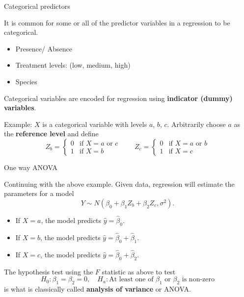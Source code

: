 \documentclass[
  ignorenonframetext,
]{beamer}
\providecommand{\tightlist}{%
  \setlength{\itemsep}{0pt}\setlength{\parskip}{0pt}}
\begin{document}
\begin{frame}{Categorical predictors}
\protect\hypertarget{categorical-predictors}{}

It is common for some or all of the predictor variables in a regression
to be categorical.

\begin{itemize}
\tightlist
\item
  Presence/ Absence
\item
  Treatment levels: (low, medium, high)
\item
  Species
\end{itemize}

Categorical variables are encoded for regression using \textbf{indicator
(dummy) variables}.

Example: \(X\) is a categorical variable with levels \(a\), \(b\),
\(c\). Arbitrarily choose \(a\) as the \textbf{reference level} and
define \[
Z_b=\begin{cases} 
0 & \mbox{if } X =a\text{ or }c \\
1 & \mbox{if } X=b 
\end{cases}
\qquad
Z_c=\begin{cases} 
0 & \mbox{if } X = a \text{ or } b\\
1 & \mbox{if } X=c 
\end{cases}
\]

\end{frame}

\begin{frame}{One way ANOVA}
\protect\hypertarget{one-way-anova}{}

Continuing with the above example. Given data, regression will estimate
the parameters for a model \[
Y \sim N(\beta_0+\beta_1Z_b+\beta_2Z_c, \sigma^2).
\]

\begin{itemize}
\tightlist
\item
  If \(X=a\), the model predicts \(\hat y= \hat\beta_0\).
\item
  If \(X=b\), the model predicts \(\hat y= \hat\beta_0 + \hat\beta_1\).
\item
  If \(X=c\), the model predicts \(\hat y= \hat\beta_0 + \hat\beta_2\).
\end{itemize}

The hypothesis test using the \(F\) statistic as above to test \[
H_0: \beta_1=\beta_2=0, \quad H_a: \text{At least one of $\beta_1$ or $\beta_2$ is non-zero}
\] is what is classically called \textbf{analysis of variance} or ANOVA.

\end{frame}
\end{document}
